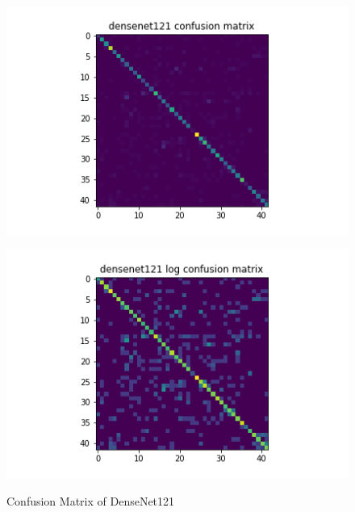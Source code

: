 \begin{figure}[H]
\begin{minipage}[b]{.5\linewidth}
    {\includegraphics[width=1.2\textwidth]{figs/conf_matrix/densenet121_conf.png}}
  \end{minipage}
  \hfill
  \begin{minipage}[b]{.5\linewidth}
    \centering

    {\includegraphics[width=1.2\textwidth]{figs/conf_matrix/densenet121_log_conf.png}}

  \end{minipage}

  \caption{Confusion Matrix of DenseNet121}
  \label{fig:densenet121_conf}
  \vspace{0.2in}
\end{figure}

